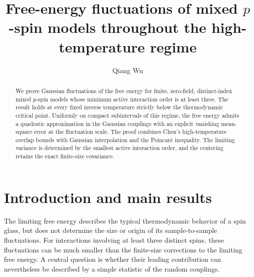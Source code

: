 \documentclass[letterpaper,11pt,reqno]{amsart}
\begin{document}
\title[Mixed $p$-spin free-energy fluctuations]{Free-energy fluctuations of mixed $p$-spin models throughout the high-temperature regime}
\author[Wu]{Qiang Wu}
\date{}
\makeatletter
{}
\makeatother
{}
\begin{abstract}
	We prove Gaussian fluctuations of the free energy for finite, zero-field, distinct-index mixed $p$-spin models whose minimum active interaction order is at least three. The result holds at every fixed inverse temperature strictly below the thermodynamic critical point. Uniformly on compact subintervals of this regime, the free energy admits a quadratic approximation in the Gaussian couplings with an explicit vanishing mean-square error at the fluctuation scale. The proof combines Chen's high-temperature overlap bounds with Gaussian interpolation and the Poincar\'e inequality. The limiting variance is determined by the smallest active interaction order, and the centering retains the exact finite-size covariance. 
\end{abstract}

\maketitle
\setcounter{tocdepth}{1}\tableofcontents


\section{Introduction and main results}
\label{sec:introduction}


The limiting free energy describes the typical thermodynamic behavior of
a spin glass, but does not determine the size or origin of its
sample-to-sample fluctuations. For interactions involving at least three
distinct spins, these fluctuations can be much smaller than the
finite-size corrections to the limiting free energy. A central question
is whether their leading contribution can nevertheless be described by
a simple statistic of the random couplings.
\end{document}
